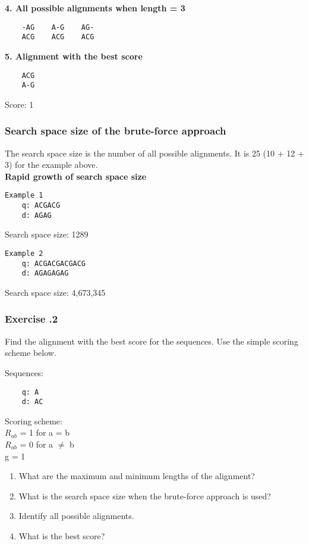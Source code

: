 \noindent \textbf{4. All possible alignments when length = 3}
\begin{verbatim}
    -AG    A-G    AG-
    ACG    ACG    ACG
\end{verbatim}
\medskip

\noindent \textbf{5. Alignment with the best score}
\begin{verbatim}
    ACG
    A-G	
\end{verbatim}

Score: 1

%
%
\subsubsection*{Search space size of the brute-force approach}
The search space size is the number of all possible alignments. It is 25 (10 + 12 + 3) for the example above. \\

\noindent \textbf{Rapid growth of search space size}

\begin{multicols}{2}
\begin{verbatim}
Example 1
    q: ACGACG
    d: AGAG
\end{verbatim}
Search space size: 1289

\begin{verbatim}
Example 2
    q: ACGACGACGACG
    d: AGAGAGAG
\end{verbatim}
Search space size: 4,673,345

\end{multicols}

%
%
\subsubsection*{Exercise \thesection.2}
Find the alignment with the best score for the sequences.  Use the simple scoring scheme below.

\begin{multicols}{2}
Sequences:
\begin{verbatim}
    q: A
    d: AC
\end{verbatim}
\vfill\null
\columnbreak

\noindent Scoring scheme: \\ 
$R_{ab}$ = 1 for a = b \\ 
$R_{ab}$ = 0 for a $\neq$ b \\ 
g = 1

\end{multicols} 

\begin{enumerate}
\item What are the maximum and minimum lengths of the alignment?
\item What is the search space size when the brute-force approach is used?
\item Identify all possible alignments.
\item What is the best score?
\end{enumerate}

%
